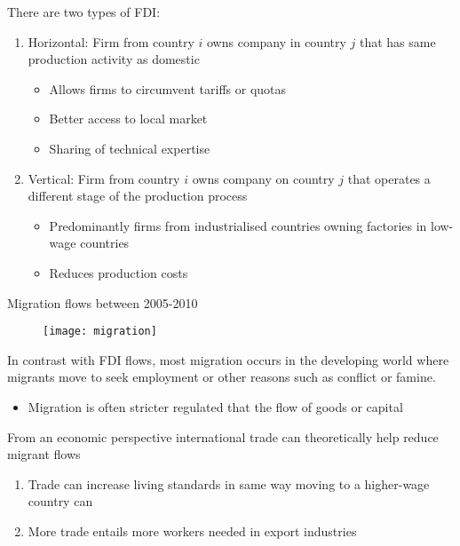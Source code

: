 \documentclass{beamer}
\begin{document}
\begin{frame}{}
There are two types of FDI:
\medskip
\begin{enumerate}
  \item Horizontal: Firm from country $i$ owns company in country $j$ that has same production activity as domestic
  \begin{itemize}
    \item Allows firms to circumvent tariffs or quotas
    \item Better access to local market
    \item Sharing of technical expertise
  \end{itemize}
  \medskip
  \item Vertical: Firm from country $i$ owns company on country $j$ that operates a different stage of the production process
  \begin{itemize}
    \item Predominantly firms from industrialised countries owning factories in low-wage countries
    \item Reduces production costs
  \end{itemize}
\end{enumerate}  
\end{frame}

\begin{frame}{Migration flows between 2005-2010}
  \begin{figure}
    \texttt{[image: migration]}
  \end{figure}  
\end{frame}

\begin{frame}{}
  In contrast with FDI flows, most migration occurs in the developing world where migrants move to seek employment or other reasons such as conflict or famine.
  \begin{itemize}
    \item Migration is often stricter regulated that the flow of goods or capital
  \end{itemize}
  \bigskip
  From an economic perspective international trade can theoretically help reduce migrant flows
  \begin{enumerate}
    \item Trade can increase living standards in same way moving to a higher-wage country can
    \item More trade entails more workers needed in export industries
  \end{enumerate}
\end{frame}


\end{document}
